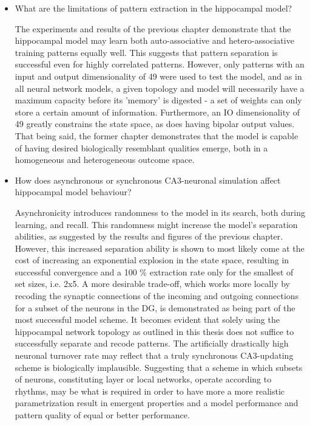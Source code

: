 
\begin{itemize}
    \item What are the limitations of pattern extraction in the hippocampal model?
    
    The experiments and results of the previous chapter demonstrate that the hippocampal model may learn both auto-associative and hetero-associative training patterns equally well. This suggests that pattern separation is successful even for highly correlated patterns. However, only patterns with an input and output dimensionality of 49 were used to test the model, and as in all neural network models, a given topology and model will necessarily have a maximum capacity before its 'memory' is digested - a set of weights can only store a certain amount of information. Furthermore, an IO dimensionality of 49 greatly constrains the state space, as does having bipolar output values. That being said, the former chapter demonstrates that the model is capable of having desired biologically resemblant qualities emerge, both in a homogeneous and heterogeneous outcome space.
    
    \item How does asynchronous or synchronous CA3-neuronal simulation affect hippocampal model behaviour?
    
    Asynchronicity introduces randomness to the model in its search, both during learning, and recall. This randomness might increase the model's separation abilities, as suggested by the results and figures of the previous chapter. However, this increased separation ability is shown to most likely come at the cost of increasing an exponential explosion in the state space, resulting in successful convergence and a 100 \% extraction rate only for the smallest of set sizes, i.e. 2x5. A more desirable trade-off, which works more locally by recoding the synaptic connections of the incoming and outgoing connections for a subset of the neurons in the DG, is demonstrated as being part of the most successful model scheme. It becomes evident that solely using the hippocampal network topology as outlined in this thesis does not suffice to successfully separate and recode patterns. The artificially drastically high neuronal turnover rate may reflect that a truly synchronous CA3-updating scheme is biologically implausible. Suggesting that a scheme in which subsets of neurons, constituting layer or local networks, operate according to rhythms, may be what is required in order to have more a more realistic parametrization result in emergent properties and a model performance and pattern quality of equal or better performance.
    

\end{itemize}
